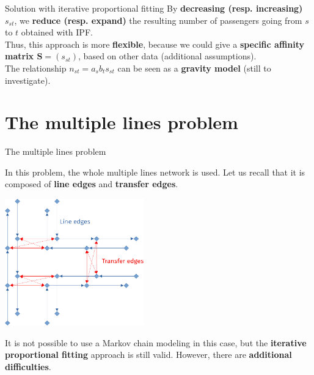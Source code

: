 \documentclass[10pt]{beamer}
\newcommand{\imp}[1]{\textbf{\color{cyan}#1}}
\begin{document}
	
	\begin{frame}{Solution with iterative proportional fitting}
		By \imp{decreasing (resp. increasing) $s_{st}$}, we \imp{reduce (resp. expand)} the resulting number of passengers going from $s$ to $t$ obtained with IPF. \\
		\vspace{0.4cm}
		Thus, this approach is more \imp{flexible}, because we could give a \imp{specific affinity matrix $\mathbf{S} = (s_{st})$}, based on other data (additional assumptions).\\
		\vspace{0.4cm}
		The relationship $n_{st} = a_s b_t s_{st}$ can be seen as a \imp{gravity model} (still to investigate).
	\end{frame}
		
	
	\section{The multiple lines problem}
	
	
	\begin{frame}{The multiple lines problem}
		
		In this problem, the whole multiple lines network is used. Let us recall that it is composed of \imp{line edges} and \imp{transfer edges}.
		
		\begin{center}
			\includegraphics[width=0.45\textwidth]{img/edge_type2.png}
		\end{center}
	
		It is not possible to use a Markov chain modeling in this case, but the \imp{iterative proportional fitting} approach is still valid. However, there are \imp{additional difficulties}.
		
	\end{frame}
	
\end{document}

